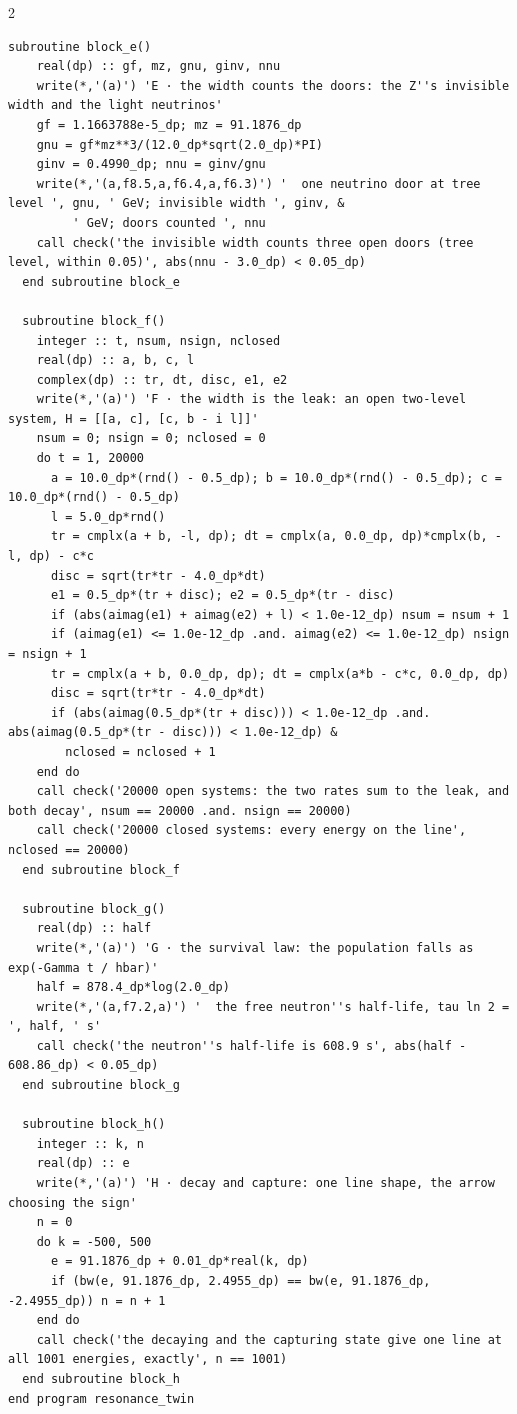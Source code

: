 \documentclass[10pt]{article}
\begin{document}
\begin{multicols}{2}
\begin{Verbatim}[fontsize=\fontsize{5.9}{6.8}\selectfont,breaklines,breakanywhere,breaksymbolleft={}]
  subroutine block_e()
    real(dp) :: gf, mz, gnu, ginv, nnu
    write(*,'(a)') 'E · the width counts the doors: the Z''s invisible width and the light neutrinos'
    gf = 1.1663788e-5_dp; mz = 91.1876_dp
    gnu = gf*mz**3/(12.0_dp*sqrt(2.0_dp)*PI)
    ginv = 0.4990_dp; nnu = ginv/gnu
    write(*,'(a,f8.5,a,f6.4,a,f6.3)') '  one neutrino door at tree level ', gnu, ' GeV; invisible width ', ginv, &
         ' GeV; doors counted ', nnu
    call check('the invisible width counts three open doors (tree level, within 0.05)', abs(nnu - 3.0_dp) < 0.05_dp)
  end subroutine block_e

  subroutine block_f()
    integer :: t, nsum, nsign, nclosed
    real(dp) :: a, b, c, l
    complex(dp) :: tr, dt, disc, e1, e2
    write(*,'(a)') 'F · the width is the leak: an open two-level system, H = [[a, c], [c, b - i l]]'
    nsum = 0; nsign = 0; nclosed = 0
    do t = 1, 20000
      a = 10.0_dp*(rnd() - 0.5_dp); b = 10.0_dp*(rnd() - 0.5_dp); c = 10.0_dp*(rnd() - 0.5_dp)
      l = 5.0_dp*rnd()
      tr = cmplx(a + b, -l, dp); dt = cmplx(a, 0.0_dp, dp)*cmplx(b, -l, dp) - c*c
      disc = sqrt(tr*tr - 4.0_dp*dt)
      e1 = 0.5_dp*(tr + disc); e2 = 0.5_dp*(tr - disc)
      if (abs(aimag(e1) + aimag(e2) + l) < 1.0e-12_dp) nsum = nsum + 1
      if (aimag(e1) <= 1.0e-12_dp .and. aimag(e2) <= 1.0e-12_dp) nsign = nsign + 1
      tr = cmplx(a + b, 0.0_dp, dp); dt = cmplx(a*b - c*c, 0.0_dp, dp)
      disc = sqrt(tr*tr - 4.0_dp*dt)
      if (abs(aimag(0.5_dp*(tr + disc))) < 1.0e-12_dp .and. abs(aimag(0.5_dp*(tr - disc))) < 1.0e-12_dp) &
        nclosed = nclosed + 1
    end do
    call check('20000 open systems: the two rates sum to the leak, and both decay', nsum == 20000 .and. nsign == 20000)
    call check('20000 closed systems: every energy on the line', nclosed == 20000)
  end subroutine block_f

  subroutine block_g()
    real(dp) :: half
    write(*,'(a)') 'G · the survival law: the population falls as exp(-Gamma t / hbar)'
    half = 878.4_dp*log(2.0_dp)
    write(*,'(a,f7.2,a)') '  the free neutron''s half-life, tau ln 2 = ', half, ' s'
    call check('the neutron''s half-life is 608.9 s', abs(half - 608.86_dp) < 0.05_dp)
  end subroutine block_g

  subroutine block_h()
    integer :: k, n
    real(dp) :: e
    write(*,'(a)') 'H · decay and capture: one line shape, the arrow choosing the sign'
    n = 0
    do k = -500, 500
      e = 91.1876_dp + 0.01_dp*real(k, dp)
      if (bw(e, 91.1876_dp, 2.4955_dp) == bw(e, 91.1876_dp, -2.4955_dp)) n = n + 1
    end do
    call check('the decaying and the capturing state give one line at all 1001 energies, exactly', n == 1001)
  end subroutine block_h
end program resonance_twin
\end{Verbatim}
\end{multicols}
\end{document}

